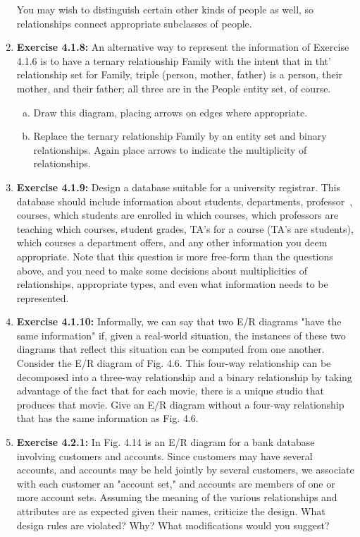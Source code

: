 \documentclass[12pt]{article}
\begin{document}
\begin{enumerate}[1.]
    You may wish to distinguish certain other kinds of people as well, so relationships connect appropriate subclasses of people.


    \item \textbf{Exercise 4.1.8:} An alternative way to represent the information of Exercise
    4.1.6 is to have a ternary relationship Family with the intent that in tht'
    relationship set for Family, triple (person, mother, father) is a person, their
    mother, and their father; all three are in the People entity set, of course.

    \bigskip

    \begin{enumerate}[a)]
        \item Draw this diagram, placing arrows on edges where appropriate.
        \item Replace the ternary relationship Family by an entity set and binary relationships. Again place arrows to indicate the multiplicity of relationships.
    \end{enumerate}

    \item \textbf{Exercise 4.1.9:} Design a database suitable for a university registrar. This
    database should include information about students, departments, professor~,
    courses, which students are enrolled in which courses, which professors are
    teaching which courses, student grades, TA's for a course (TA's are students),
    which courses a department offers, and any other information you deem appropriate.
    Note that this question is more free-form than the questions above, and
    you need to make some decisions about multiplicities of relationships, appropriate
    types, and even what information needs to be represented.

    \item \textbf{Exercise 4.1.10:} Informally, we can say that two E/R diagrams "have the
    same information" if, given a real-world situation, the instances of these two diagrams
    that reflect this situation can be computed from one another. Consider
    the E/R diagram of Fig. 4.6. This four-way relationship can be decomposed
    into a three-way relationship and a binary relationship by taking advantage
    of the fact that for each movie, there is a unique studio that produces that
    movie. Give an E/R diagram without a four-way relationship that has the
    same information as Fig. 4.6.

    \item \textbf{Exercise 4.2.1:} In Fig. 4.14 is an E/R diagram for a bank database involving
    customers and accounts. Since customers may have several accounts, and accounts may be held jointly by several customers, we associate with each customer
    an "account set," and accounts are members of one or more account sets.
    Assuming the meaning of the various relationships and attributes are as expected
    given their names, criticize the design. What design rules are violated?
    Why? What modifications would you suggest?


\end{enumerate}
\end{document}

